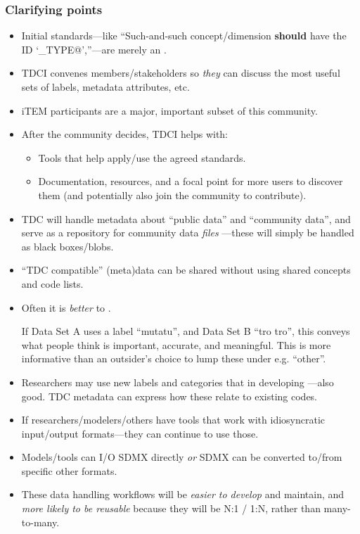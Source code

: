 \documentclass[12pt,aspectratio=169]{beamer}
\begin{document}
\begin{frame}
\frametitle{Clarifying points}

\begin{itemize}
  \item Initial standards—like “Such-and-such concept/dimension \textbf{should} have the ID ‘\verb@VEHICLE_TYPE@’,”—are merely an .
  \item TDCI convenes members/stakeholders so \emph{they} can discuss the most useful sets of labels, metadata attributes, etc.
  \item iTEM participants are a major, important subset of this community.
  \item After the community decides, TDCI helps with:
    \begin{itemize}
      \item Tools that help apply/use the agreed standards.
      \item Documentation, resources, and a focal point for more users to discover them (and potentially also join the community to contribute).
    \end{itemize}
\end{itemize}

\framebreak
{}
\begin{itemize}
  \item TDC will handle metadata about “public data” and “community data”, and serve as a repository for community data \emph{files} —these will simply be handled as black boxes/blobs.
  \item “TDC compatible” (meta)data can be shared without using shared concepts and code lists.
  \item Often it is \emph{better} to .

  {\footnotesize If Data Set A uses a label “mutatu”, and Data Set B “tro tro”, this conveys what people think is important, accurate, and meaningful.
  This is more informative than an outsider's choice to lump these under e.g. “other”.}
  \item Researchers may use new labels and categories that in developing —also good. TDC metadata can express how these relate to existing codes.
\end{itemize}

\framebreak
{}
\begin{itemize}
  \item If researchers/modelers/others have tools that work with idiosyncratic input/output formats—they can continue to use those.
  \item Models/tools can I/O SDMX directly \emph{or} SDMX can be converted to/from specific other formats.
  \item These data handling workflows will be \emph{easier to develop} and maintain, and \emph{more likely to be reusable} because they will be N:1 / 1:N, rather than many-to-many.
\end{itemize}


\end{frame}
\end{document}
